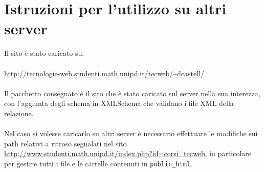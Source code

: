 \documentclass[../relazione.tex]{subfiles}
\begin{document}
\section{Istruzioni per l'utilizzo su altri server}
	Il sito è stato caricato su:\\\\
	\url{http://tecnologie-web.studenti.math.unipd.it/tecweb/~dcastell/}
	\\\\Il pacchetto consegnato è il sito che è stato caricato sul server nella sua interezza, con l'aggiunta degli schema in XMLSchema che validano i file XML della relazione.\\\\
	Nel caso si volesse caricarlo su altri server è necessario effettuare le modifiche sui path relativi a ritroso segnalati nel sito \url{http://www.studenti.math.unipd.it/index.php?id=corsi_tecweb}, in particolare per gestire tutti i file e le cartelle contenuti in \texttt{public\_html}.\\
\end{document}
